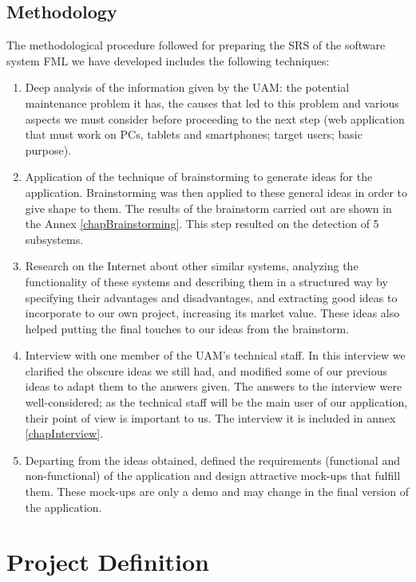 \documentclass{report}
\begin{document}
\section{Methodology}

The methodological procedure followed for preparing the SRS of the software system FML we have developed includes the following techniques:
\begin{enumerate}
\item Deep analysis of the information given by the UAM: the potential maintenance problem it has, the causes that led to this problem and various aspects we must consider before proceeding to the next step (web application that must work on PCs, tablets and smartphones; target users; basic purpose).
\item Application of the technique of brainstorming to generate ideas for the application. Brainstorming was then applied to these general ideas in order to give shape to them. The results of the brainstorm carried out are shown in the Annex \ref{chapBrainstorming}. This step resulted on the detection of 5 subsystems.
\item Research on the Internet about other similar systems, analyzing the functionality of these systems and describing them in a structured way by specifying their advantages and disadvantages, and extracting good ideas to incorporate to our own project, increasing its market value. These ideas also helped putting the final touches to our ideas from the brainstorm.
\item Interview with one member of the UAM's technical staff. In this interview we clarified the obscure ideas we still had, and modified some of our previous ideas to adapt them to the answers given. The answers to the interview were well-considered; as the technical staff will be the main user of our application, their point of view is important to us. The interview it is included in annex \ref{chapInterview}.
\item Departing from the ideas obtained, defined the requirements (functional and non-functional) of the application and design attractive mock-ups that fulfill them. These mock-ups are only a demo and may change in the final version of the application.
\end{enumerate}

\chapter{Project Definition}
\label{chapProjectDefinition}
\end{document}
